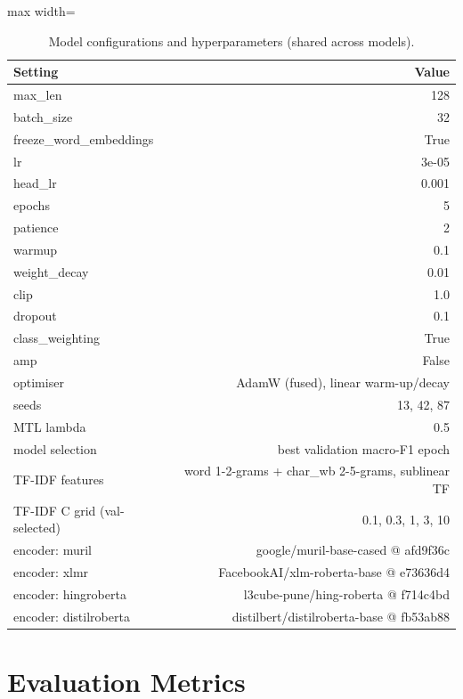 \documentclass[10pt,twocolumn]{article}
\begin{document}
\begin{table}[t]
\centering
\small
\caption{Model configurations and hyperparameters (shared across models).}
\label{tab:hparams}
\begin{adjustbox}{max width=\textwidth}\begin{tabular}{lr}
\toprule
Setting & Value \\
\midrule
max\_len & 128 \\
batch\_size & 32 \\
freeze\_word\_embeddings & True \\
lr & 3e-05 \\
head\_lr & 0.001 \\
epochs & 5 \\
patience & 2 \\
warmup & 0.1 \\
weight\_decay & 0.01 \\
clip & 1.0 \\
dropout & 0.1 \\
class\_weighting & True \\
amp & False \\
optimiser & AdamW (fused), linear warm-up/decay \\
seeds & 13, 42, 87 \\
MTL lambda & 0.5 \\
model selection & best validation macro-F1 epoch \\
TF-IDF features & word 1-2-grams + char\_wb 2-5-grams, sublinear TF \\
TF-IDF C grid (val-selected) & 0.1, 0.3, 1, 3, 10 \\
encoder: muril & google/muril-base-cased @ afd9f36c \\
encoder: xlmr & FacebookAI/xlm-roberta-base @ e73636d4 \\
encoder: hingroberta & l3cube-pune/hing-roberta @ f714c4bd \\
encoder: distilroberta & distilbert/distilroberta-base @ fb53ab88 \\
\bottomrule
\end{tabular}\end{adjustbox}
\end{table}


\section{Evaluation Metrics}
\end{document}
